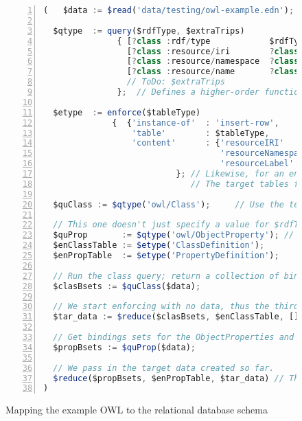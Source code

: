 \documentclass[9pt,letterpaper]{article}
\begin{document}
\begin{figure}[H]
  \caption{Mapping the example OWL to the relational database schema}
  \label{code:mapping-owl-to-rdbms}
\begin{lstlisting}[language=JavaScript,numberstyle=\scriptsize,basicstyle=\ttfamily\scriptsize,numbers=left,stepnumber=1,breaklines=true]
  (   $data := $read('data/testing/owl-example.edn');

  $qtype  := query($rdfType, $extraTrips)
               { [?class :rdf/type            $rdfType]
                 [?class :resource/iri        ?class-iri]
                 [?class :resource/namespace  ?class-ns]
                 [?class :resource/name       ?class-name]
                 // ToDo: $extraTrips
               };  // Defines a higher-order function, a template of sorts.

  $etype  := enforce($tableType)
              {  {'instance-of'  : 'insert-row',
                  'table'        : $tableType,
                  'content'      : {'resourceIRI'       : ?class-iri,
                                    'resourceNamespace' : ?class-ns,
                                    'resourceLabel'     : ?class-name}}
                           }; // Likewise, for an enforce template.
                              // The target tables for objects and relations a very similar.

  $quClass := $qtype('owl/Class');     // Use the template, here and the next three assignments.

  // This one doesn't just specify a value for $rdfType, but for $extraTrips.
  $quProp       := $qtype('owl/ObjectProperty'); // ToDo: ,queryTriples{[?class :rdfs/domain ?domain] [?class :rdfs/range ?range]});
  $enClassTable := $etype('ClassDefinition');
  $enPropTable  := $etype('PropertyDefinition');

  // Run the class query; return a collection of binding sets about classes.
  $clasBsets := $quClass($data);

  // We start enforcing with no data, thus the third argument is [].
  $tar_data := $reduce($clasBsets, $enClassTable, []);

  // Get bindings sets for the ObjectProperties and make similar tables.
  $propBsets := $quProp($data);

  // We pass in the target data created so far.
  $reduce($propBsets, $enPropTable, $tar_data) // The code block returns the target data.
)
\end{lstlisting}
\end{figure}
\end{document}
